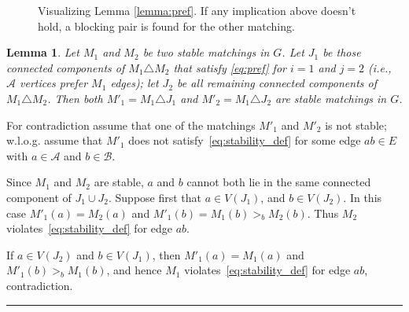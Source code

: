 \documentclass[preprint]{elsarticle}
\newtheorem{lemma}[fact]{Lemma}
\newenvironment{proof}{{\bf Proof:  }}{\hfill\rule{2mm}{2mm}}
\newcommand{\cA}{\mathcal{A}} \newcommand{\cB}{\mathcal{B}}
\begin{document}
\begin{figure}[H]
\centering
{}
\caption{Visualizing Lemma \ref{lemma:pref}. If any implication above doesn't hold, a blocking pair is found for the other matching.}
\end{figure}

\begin{lemma}\label{lemma:sym_stable} 
  Let $M_1$ and $M_2$ be two stable matchings in $G$. Let $J_1$ be
  those connected components of $M_1 \triangle M_2$ 
  that satisfy
  \eqref{eq:pref} for $i=1$ and $j=2$ (i.e., $\cA$ vertices prefer
  $M_1$ edges); let $J_2$ be all
  remaining connected components of $M_1 \triangle M_2$. 
  Then both $M'_1 = M_1\triangle J_1$ and
  $M'_2=M_1\triangle J_2$ are stable matchings in $G$.
\end{lemma}
\begin{proof}
  For contradiction assume
  that one of the matchings $M'_1$ and $M'_2$ is not stable; w.l.o.g. assume that
  $M'_1$ does not satisfy~\eqref{eq:stability_def} for some edge
  $ab\in E$ with $a\in\mathcal{A}$ and $b\in\mathcal{B}$.

  Since $M_1$ and $M_2$ are stable, $a$ and $b$ cannot both lie in the
  same connected component of $J_1 \cup J_2$. Suppose first that $a \in
  V(J_1)$, and $b \in V(J_2)$. In this case $M'_1(a)=M_2(a)$ and
  $M'_1(b) = M_1(b) >_b M_2(b)$. Thus $M_2$
  violates~\eqref{eq:stability_def} for edge $ab$. 

  If $a\in V(J_2)$
  and $b\in V(J_1)$, then $M'_1(a)=M_1(a)$ and $M'_1(b)>_b M_1(b)$,
  and hence $M_1$ violates~\eqref{eq:stability_def} for edge $ab$,
  contradiction.
\end{proof}
\end{document}
